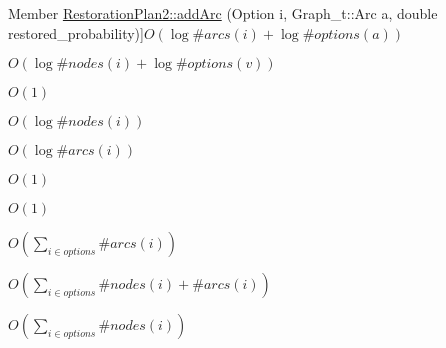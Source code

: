 \begin{DoxyRefList}
%
Member \hyperlink{class_restoration_plan2_a37dd2e978ecb5e36fa2c35e5025cf729}{Restoration\+Plan2\+:\+:add\+Arc} (Option i, Graph\+\_\+t\+::\+Arc a, double restored\+\_\+probability)]$O(\log \#arcs(i) + \log \#options(a))$  
\item[\label{time__time000013}%
\Hypertarget{time__time000013}%
Member \hyperlink{class_restoration_plan2_a0a5a2740cdea0ec03ffa9c5d1d94a202}{Restoration\+Plan2\+:\+:add\+Node} (Option i, Graph\+\_\+t\+::\+Node v, double quality\+\_\+gain)]$O(\log \#nodes(i) + \log \#options(v))$  
\item[\label{time__time000023}%
\Hypertarget{time__time000023}%
Member \hyperlink{class_restoration_plan2_a7461e5c0cd622f9e6adbf38f34753a07}{Restoration\+Plan2\+:\+:add\+Option} (double c)]$O(1)$  
\item[\label{time__time000009}%
\Hypertarget{time__time000009}%
Member \hyperlink{class_restoration_plan2_acf5e11d698c3306efeafaa5ca5d6f3ed}{Restoration\+Plan2\+:\+:contains} (Option i, Graph\+\_\+t\+::\+Node v) const]$O(\log \#nodes(i))$  
\item[\label{time__time000010}%
\Hypertarget{time__time000010}%
Member \hyperlink{class_restoration_plan2_a1884daec27de69af8302b961aee1b232}{Restoration\+Plan2\+:\+:contains} (Option i, Graph\+\_\+t\+::\+Arc a) const]$O(\log \#arcs(i))$  
\item[\label{time__time000011}%
\Hypertarget{time__time000011}%
Member \hyperlink{class_restoration_plan2_a753668d5ba34ea1e088aee85218543b7}{Restoration\+Plan2\+:\+:contains} (Graph\+\_\+t\+::\+Node v) const]$O(1)$  
\item[\label{time__time000012}%
\Hypertarget{time__time000012}%
Member \hyperlink{class_restoration_plan2_acac88b4dcb361cf6ca3061457ff05bfa}{Restoration\+Plan2\+:\+:contains} (Graph\+\_\+t\+::\+Arc a) const]$O(1)$  
\item[\label{time__time000031}%
\Hypertarget{time__time000031}%
Member \hyperlink{class_restoration_plan2_a51e5a2f223e0cbd8763f0ff60c8a4599}{Restoration\+Plan2\+:\+:erase\+Invalid\+Arcs} ()]$O(\sum_{i \in options} \#arcs(i))$  
\item[\label{time__time000032}%
\Hypertarget{time__time000032}%
Member \hyperlink{class_restoration_plan2_aeb925e92d2141fe96979538f087c277a}{Restoration\+Plan2\+:\+:erase\+Invalid\+Elements} ()]$O(\sum_{i \in options} \#nodes(i) + \#arcs(i))$  
\item[\label{time__time000030}%
\Hypertarget{time__time000030}%
Member \hyperlink{class_restoration_plan2_a5258c8409176279c8bab604400722b25}{Restoration\+Plan2\+:\+:erase\+Invalid\+Nodes} ()]$O(\sum_{i \in options} \#nodes(i))$  

\end{DoxyRefList}
